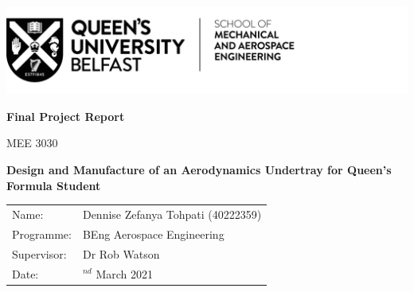 \begin{titlepage}
\includegraphics[scale=1]{Figures/QUB LOGO - SMAE.png}
\centering

\vspace{4cm}
\textbf{Final Project Report}

MEE 3030

\vspace{2cm}
\textbf{\large{Design and Manufacture of an Aerodynamics Undertray for Queen's Formula Student}}


\vspace{8cm}
\begin{tabularx}{1\textwidth}{ 
   >{\raggedleft\arraybackslash}X 
   >{\raggedright\arraybackslash}X 
  }
  
Name: & \quad Dennise Zefanya Tohpati (40222359)\\
Programme: & \quad BEng Aerospace Engineering\\
Supervisor: & \quad Dr Rob Watson\\
Date: & \quad 22$^{nd}$ March 2021\\

\end{tabularx}
\end{titlepage}

